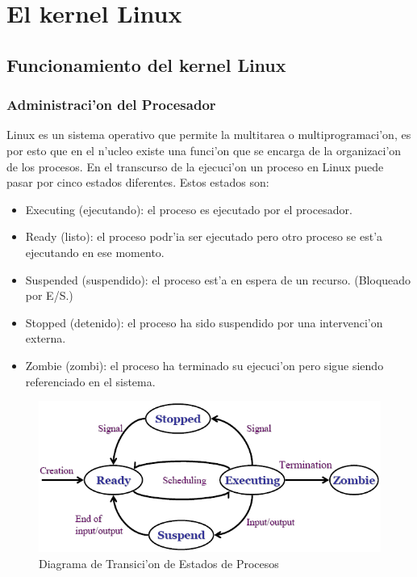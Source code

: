 \section{El kernel Linux}
\subsection{Funcionamiento del kernel Linux}
\subsubsection{Administraci'on del Procesador}
Linux es un sistema operativo que permite la multitarea o multiprogramaci'on, es por esto que en el n'ucleo existe una funci'on que se encarga de la organizaci'on de los procesos. En el transcurso de la ejecuci'on un proceso en Linux puede pasar por cinco estados diferentes. Estos estados son:

\begin{itemize}
	\item Executing (ejecutando): el proceso es ejecutado por el procesador.
	\item Ready (listo): el proceso podr'ia ser ejecutado pero otro proceso se est'a ejecutando en ese momento.
	\item Suspended (suspendido): el proceso est'a en espera de un recurso. (Bloqueado por E/S.)
	\item Stopped (detenido): el proceso ha sido suspendido por una intervenci'on externa.
	\item Zombie (zombi): el proceso ha terminado su ejecuci'on pero sigue siendo referenciado en el sistema.
\end{itemize}


\begin{figure}[h]
\centering
\includegraphics[scale=0.5]{TransicionEstados.png} 
Diagrama de Transici'on de Estados de Procesos 
\end{figure}

